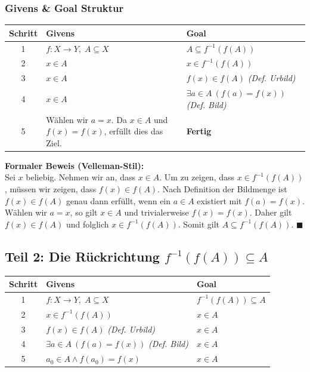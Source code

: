 \documentclass[11pt,a4paper]{article}
\begin{document}
\subsubsection*{Givens \& Goal Struktur}
\begin{vellemantable}
\centering
\begin{tabular}{cll}
\textbf{Schritt} & \textbf{Givens} & \textbf{Goal} \\ \hline
1 & $f: X \to Y, \; A \subseteq X$ & $A \subseteq f^{-1}(f(A))$ \\
2 & $x \in A$ & $x \in f^{-1}(f(A))$ \\
3 & $x \in A$ & $f(x) \in f(A)$ \quad \textit{(Def. Urbild)} \\
4 & $x \in A$ & $\exists a \in A \: (f(a) = f(x))$ \quad \textit{(Def. Bild)} \\
5 & Wählen wir $a = x$. Da $x \in A$ und $f(x) = f(x)$, erfüllt dies das Ziel. & \textbf{Fertig} \\
\end{tabular}
\end{vellemantable}

\begin{proofbox}
\textbf{Formaler Beweis (Velleman-Stil):}\\
Sei $x$ beliebig. Nehmen wir an, dass $x \in A$. Um zu zeigen, dass $x \in f^{-1}(f(A))$, müssen wir zeigen, dass $f(x) \in f(A)$. Nach Definition der Bildmenge ist $f(x) \in f(A)$ genau dann erfüllt, wenn ein $a \in A$ existiert mit $f(a) = f(x)$. Wählen wir $a = x$, so gilt $x \in A$ und trivialerweise $f(x) = f(x)$. Daher gilt $f(x) \in f(A)$ und folglich $x \in f^{-1}(f(A))$. Somit gilt $A \subseteq f^{-1}(f(A))$. \hfill $\blacksquare$
\end{proofbox}

\subsection*{Teil 2: Die Rückrichtung $f^{-1}(f(A)) \subseteq A$}

\begin{vellemantable}
\centering
\begin{tabular}{cll}
\textbf{Schritt} & \textbf{Givens} & \textbf{Goal} \\ \hline
1 & $f: X \to Y, \; A \subseteq X$ & $f^{-1}(f(A)) \subseteq A$ \\
2 & $x \in f^{-1}(f(A))$ & $x \in A$ \\
3 & $f(x) \in f(A)$ \quad \textit{(Def. Urbild)} & $x \in A$ \\
4 & $\exists a \in A \: (f(a) = f(x))$ \quad \textit{(Def. Bild)} & $x \in A$ \\
5 & $a_0 \in A \land f(a_0) = f(x)$ & $x \in A$ \\
\end{tabular}
\end{vellemantable}
\end{document}
